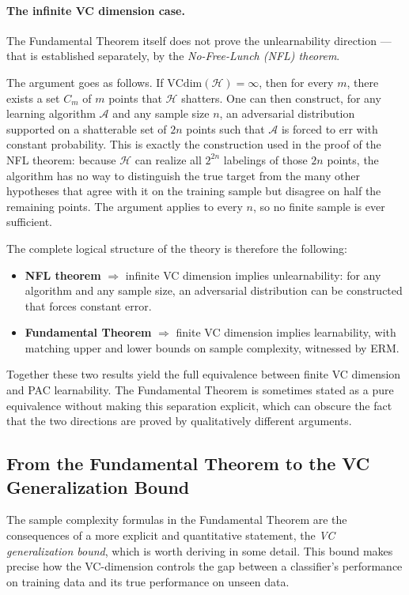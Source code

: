 \paragraph{The infinite VC dimension case.}
The Fundamental Theorem itself does not prove the unlearnability direction --- that is
established separately, by the \emph{No-Free-Lunch (NFL) theorem}.

The argument goes as follows. If $\mathrm{VCdim}(\mathcal{H}) = \infty$, then for every $m$,
there exists a set $C_m$ of $m$ points that $\mathcal{H}$ shatters. One can then construct,
for any learning algorithm $\mathcal{A}$ and any sample size $n$, an adversarial distribution
supported on a shatterable set of $2n$ points such that $\mathcal{A}$ is forced to err with
constant probability. This is exactly the construction used in the proof of the NFL theorem:
because $\mathcal{H}$ can realize all $2^{2n}$ labelings of those $2n$ points, the algorithm
has no way to distinguish the true target from the many other hypotheses that agree with it on
the training sample but disagree on half the remaining points. The argument applies to every
$n$, so no finite sample is ever sufficient.

The complete logical structure of the theory is therefore the following:
\begin{itemize}
    \item \textbf{NFL theorem} $\Rightarrow$ infinite VC dimension implies unlearnability:
    for any algorithm and any sample size, an adversarial distribution can be constructed
    that forces constant error.
    \item \textbf{Fundamental Theorem} $\Rightarrow$ finite VC dimension implies learnability,
    with matching upper and lower bounds on sample complexity, witnessed by ERM.
\end{itemize}
Together these two results yield the full equivalence between finite VC dimension and
PAC learnability. The Fundamental Theorem is sometimes stated as a pure equivalence without
making this separation explicit, which can obscure the fact that the two directions are proved
by qualitatively different arguments.

\subsection*{From the Fundamental Theorem to the VC Generalization Bound}

The sample complexity formulas in the Fundamental Theorem are the consequences of a more
explicit and quantitative statement, the \emph{VC generalization bound}, which is worth
deriving in some detail. This bound makes precise how the VC-dimension controls the gap
between a classifier's performance on training data and its true performance on unseen data.

